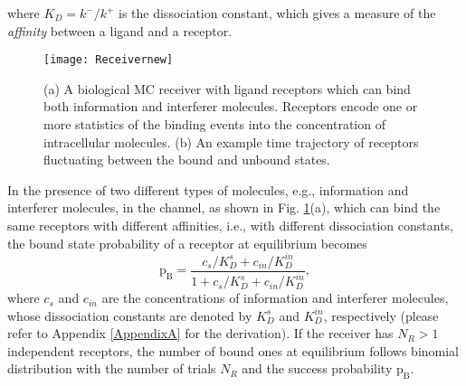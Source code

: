 \documentclass[twocolumn]{IEEEtran}
\newcommand{\p}{\mathrm{p}}
\newcommand{\B}{\mathrm{B}}
\begin{document}
where $K_D = k^-/k^+$  is the dissociation constant, which gives a measure of the \textit{affinity} between a ligand and a receptor. 
\begin{figure}[!t]
	\centering
	\texttt{[image: Receivernew]}
	\caption{(a) A biological MC receiver with ligand receptors which can bind both information and interferer molecules. Receptors encode one or more statistics of the binding events into the concentration of intracellular molecules. (b) An example time trajectory of receptors fluctuating between the bound and unbound states. }
	\label{fig:interference}
\end{figure}


In the presence of two different types of molecules, e.g., information and interferer molecules, in the channel, as shown in Fig. \ref{fig:interference}(a), which can bind the same receptors with different affinities, i.e., with different dissociation constants, the bound state probability of a receptor at equilibrium becomes 
\begin{equation} \label{probBinding2}
\p_\B = \frac{c_s/K_D^s + c_{in}/K_D^{in}  }{1 + c_s/K_D^s + c_{in}/K_D^{in}},
\end{equation}
where $c_s$ and $c_{in}$ are the concentrations of information and interferer molecules, whose dissociation constants are denoted by $K_D^s$ and $K_D^{in}$, respectively (please refer to Appendix \ref{AppendixA} for the derivation). If the receiver has $N_R > 1$ independent receptors, the number of bound ones at equilibrium follows binomial distribution with the number of trials $N_R$ and the success probability $\p_\B$. 


\end{document}
